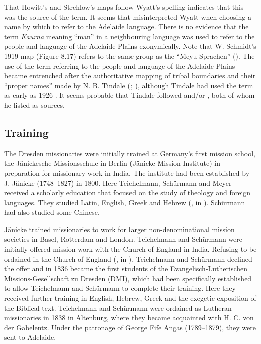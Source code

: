 That Howitt’s and Strehlow’s maps follow Wyatt’s spelling \citep[180]{woods1879} indicates that this was the source of the term. It seems that \citet{howitt_native_1904} misinterpreted Wyatt when choosing a name by which to refer to the Adelaide language. There is no evidence that the term \textit{Kaurna} meaning “man” in a neighbouring language was used to refer to the people and language of the Adelaide Plains exonymically. Note that W. Schmidt’s 1919 map (Figure 8.17) refers to the same group as the “Meyu-Sprachen” (\citeyear[41--42]{schmidt_gliederung_1919}). The use of the term referring to the people and language of the Adelaide Plains became entrenched after the authoritative mapping of tribal boundaries and their “proper names” made by N. B. Tindale (\citeyear[213]{tindale_aboriginal_1974}; \citealt[4]{amery_warrabarna_2016}), although Tindale had used the term as early as 1926 \citep[Appendix B, 8]{Amery1998}. It seems probable that Tindale followed \citet{howitt_native_1904} and/or \citet{strehlow_notitle_1910}, both of whom he listed as sources.

\subsection{Training} 
\label{sec:key:5.1.2}

The Dresden missionaries were initially trained at Germany’s first mission school, the Jänickesche Missionsschule in Berlin (Jänicke Mission Institute) in preparation for missionary work in India. The institute had been established by J. Jänicke (1748--1827) in 1800. Here Teichelmann, Schürmann and Meyer received a scholarly education that focused on the study of theology and foreign languages. They studied Latin, English, Greek and Hebrew (\citealt{schurmann_diaries_1838}, in \citealt[256]{schurmann_id_1987}). Schürmann had also studied some Chinese. 

Jänicke trained missionaries to work for larger non-denominational mission societies in Basel, Rotterdam and London. Teichelmann and Schürmann were initially offered mission work with the Church of England in India. Refusing to be ordained in the Church of England (\citealt{schurmann_diaries_1838}, in \citealt[256]{schurmann_id_1987}), Teichelmann and Schürmann declined the offer and in 1836 became the first students of the Evangelisch-Lutherischen Missions-Gesellschaft zu Dresden (DMI), which had been specifically established to allow Teichelmann and Schürmann to complete their training. Here they received further training in English, Hebrew, Greek and the exegetic exposition of the Biblical text. Teichelmann and Schürmann were ordained as Lutheran missionaries in 1838 in Altenburg, where they became acquainted with H. C. von der Gabelentz. Under the patronage of George Fife Angas (1789--1879), they were sent to Adelaide.


